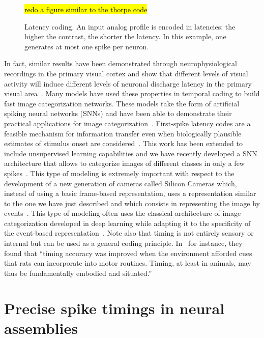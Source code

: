 \documentclass[brainsci, %
               review,submit,pdftex,moreauthors%
               ]{Definitions/mdpi}
\newcommand{\note}[1]{{\sethlcolor{yellow}\hl{#1}}}
\begin{document}
\begin{figure}
\centering
\note{redo a figure similar to the thorpe code}%
\caption{Latency coding. An input analog profile is encoded in latencies: the higher the contrast, the shorter the latency. In this example, one generates at most one spike per neuron.
}\label{fig:roc}
\end{figure}
In fact, similar results have been demonstrated through neurophysiological recordings in the primary visual cortex and show that different levels of visual activity will induce different levels of neuronal discharge latency in the primary visual area~\citep{celebrini_dynamics_1993}. Many models have used these properties in temporal coding to build fast image categorization networks. These models take the form of artificial spiking neural networks (SNNs) and have been able to demonstrate their practical applications for image categorization~\citep{delorme_ultra-rapid_2000}. First-spike latency codes are a feasible mechanism for information transfer even when biologically plausible estimates of stimulus onset are considered~\citep{chase_first-spike_2007}.  This work has been extended to include unsupervised learning capabilities and we have recently developed a SNN architecture that allows to categorize images of different classes in only a few spikes~\citep{grimaldi_homeostatic_2021,grimaldi_robust_2022}. This type of modeling is extremely important with respect to the development of a new generation of cameras called Silicon Cameras which, instead of using a basic frame-based representation, uses a representation similar to the one we have just described and which consists in representing the image by events~\citep{rasetto_challenges_2022}. This type of modeling often uses the classical architecture of image categorization developed in deep learning while adapting it to the specificity of the event-based representation~\citep{goltz_fast_2021}. Note also that timing is not entirely sensory or internal but can be used as a general coding principle. In~\citep{safaie_turning_2020} for instance, they found that ``timing accuracy was improved when the environment afforded cues that rats can incorporate into motor routines. Timing, at least in animals, may thus be fundamentally embodied and situated.'' 
%
\section{Precise spike timings in neural assemblies}
\end{document}

